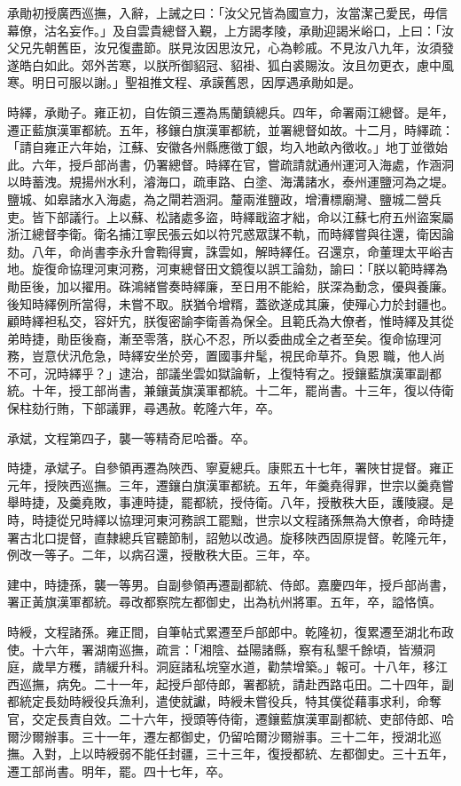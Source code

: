 \begin{pinyinscope}
承勛初授廣西巡撫，入辭，上誡之曰：「汝父兄皆為國宣力，汝當潔己愛民，毋信幕僚，沽名妄作。」及自雲貴總督入覲，上方謁孝陵，承勛迎謁米峪口，上曰：「汝父兄先朝舊臣，汝兄復盡節。朕見汝因思汝兄，心為軫戚。不見汝八九年，汝須發遂皓白如此。郊外苦寒，以朕所御貂冠、貂褂、狐白裘賜汝。汝且勿更衣，慮中風寒。明日可服以謝。」聖祖推文程、承謨舊恩，因厚遇承勛如是。

時繹，承勛子。雍正初，自佐領三遷為馬蘭鎮總兵。四年，命署兩江總督。是年，遷正藍旗漢軍都統。五年，移鑲白旗漢軍都統，並署總督如故。十二月，時繹疏：「請自雍正六年始，江蘇、安徽各州縣應徵丁銀，均入地畝內徵收。」地丁並徵始此。六年，授戶部尚書，仍署總督。時繹在官，嘗疏請就通州運河入海處，作涵洞以時蓄洩。規揚州水利，濬海口，疏車路、白塗、海溝諸水，泰州運鹽河為之堤。鹽城、如皋諸水入海處，為之閘若涵洞。釐兩淮鹽政，增漕標廟灣、鹽城二營兵吏。皆下部議行。上以蘇、松諸處多盜，時繹戢盜才絀，命以江蘇七府五州盜案屬浙江總督李衛。衛名捕江寧民張云如以符咒惑眾謀不軌，而時繹嘗與往還，衛因論劾。八年，命尚書李永升會鞫得實，誅雲如，解時繹任。召還京，命董理太平峪吉地。旋復命協理河東河務，河東總督田文鏡復以誤工論劾，諭曰：「朕以範時繹為勛臣後，加以擢用。硃鴻緒嘗奏時繹廉，至日用不能給，朕深為動念，優與養廉。後知時繹例所當得，未嘗不取。朕猶令增糈，蓋欲遂成其廉，使殫心力於封疆也。顧時繹袒私交，容奸宄，朕復密諭李衛善為保全。且範氏為大僚者，惟時繹及其從弟時捷，勛臣後裔，漸至零落，朕心不忍，所以委曲成全之者至矣。復命協理河務，豈意伏汛危急，時繹安坐於旁，置國事弁髦，視民命草芥。負恩職，他人尚不可，況時繹乎？」逮治，部議坐雲如獄論斬，上復特宥之。授鑲藍旗漢軍副都統。十年，授工部尚書，兼鑲黃旗漢軍都統。十二年，罷尚書。十三年，復以侍衛保柱劾行賄，下部議罪，尋遇赦。乾隆六年，卒。

承斌，文程第四子，襲一等精奇尼哈番。卒。

時捷，承斌子。自參領再遷為陜西、寧夏總兵。康熙五十七年，署陜甘提督。雍正元年，授陜西巡撫。三年，遷鑲白旗漢軍都統。五年，年羹堯得罪，世宗以羹堯嘗舉時捷，及羹堯敗，事連時捷，罷都統，授侍衛。八年，授散秩大臣，護陵寢。是時，時捷從兄時繹以協理河東河務誤工罷黜，世宗以文程諸孫無為大僚者，命時捷署古北口提督，直隸總兵官聽節制，詔勉以改過。旋移陜西固原提督。乾隆元年，例改一等子。二年，以病召還，授散秩大臣。三年，卒。

建中，時捷孫，襲一等男。自副參領再遷副都統、侍郎。嘉慶四年，授戶部尚書，署正黃旗漢軍都統。尋改都察院左都御史，出為杭州將軍。五年，卒，謚恪慎。

時綬，文程諸孫。雍正間，自筆帖式累遷至戶部郎中。乾隆初，復累遷至湖北布政使。十六年，署湖南巡撫，疏言：「湘陰、益陽諸縣，察有私墾千餘頃，皆瀕洞庭，歲旱方穫，請緩升科。洞庭諸私垸窒水道，勸禁增築。」報可。十八年，移江西巡撫，病免。二十一年，起授戶部侍郎，署都統，請赴西路屯田。二十四年，副都統定長劾時綬役兵漁利，遣使就讞，時綬未嘗役兵，特其僕從藉事求利，命奪官，交定長責自效。二十六年，授頭等侍衛，遷鑲藍旗漢軍副都統、吏部侍郎、哈爾沙爾辦事。三十一年，遷左都御史，仍留哈爾沙爾辦事。三十二年，授湖北巡撫。入對，上以時綬弱不能任封疆，三十三年，復授都統、左都御史。三十五年，遷工部尚書。明年，罷。四十七年，卒。


\end{pinyinscope}
